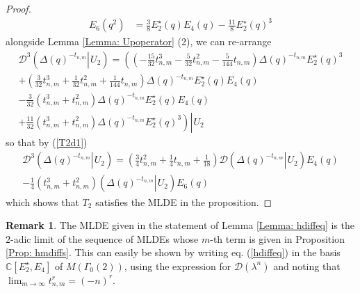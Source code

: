 \documentclass[10pt,a4paper]{amsart}
\numberwithin{equation}{section}
\theoremstyle{definition}
\newtheorem{Rem}[Th]{Remark}
\newcommand{\haupt}{\lambda}
\newcommand{\utwo}[1]{\left. #1 \right\rvert \hspace{1pt} U_{2}}
\begin{document}
\begin{proof}
\begin{align*}
           E_{6}(q^{2}) &= \frac{3}{8}E_{2}^{\star}(q)E_{4}(q) - \frac{11}{8}E_{2}^{\star}(q)^{3}
       \end{align*}
   alongside Lemma \ref{Lemma: Upoperator} (2), we can re-arrange
   \begin{multline*}
           \mathcal{D}^{3} \left( \utwo{ \Delta (q)^{-t_{n,m}} } \right) = \left. \left( \left( - \frac{15}{32} t_{n,m}^{3} - \frac{5}{32} t_{n,m}^{2} - \frac{5}{144} t_{n,m} \right) \Delta (q)^{-t_{n,m}}E_{2}^{\star}(q)^{3} \right. \right. \\ 
           \left. \left. + \left( \frac{3}{32} t_{n,m}^{3} + \frac{1}{32} t_{n,m}^{2} + \frac{1}{144} t_{n,m} \right) \Delta (q)^{- t_{n,m}} E_{2}^{\star}(q)E_{4}(q) \right. \right. \\
           \left. \left. - \frac{3}{32} \left( t_{n,m}^{3} + t_{n,m}^{2} \right) \Delta (q)^{- t_{n,m}} E_{2}^{\star}(q)E_{4}(q) \right. \right. \\
           \utwo{ \left. + \frac{11}{32} \left( t_{n,m}^{3} + t_{n,m}^{2} \right) \Delta (q)^{- t_{n,m}} E_{2}^{\star}(q)^{3} \right) }
       \end{multline*}
       so that by (\ref{T2d1})
       \begin{multline*}
           \mathcal{D}^{3} \left( \utwo{ \Delta (q)^{- t_{n,m}} } \right) = \left( \frac{3}{4} t_{n,m}^{2} + \frac{1}{4} t_{n,m} + \frac{1}{18} \right) \mathcal{D} \left( \utwo{ \Delta (q)^{- t_{n,m}} } \right) E_{4}(q) \\
           - \frac{1}{4} \left( t_{n,m}^{3} + t_{n,m}^{2} \right) \left( \utwo{ \Delta (q)^{- t_{n,m}} } \right) E_{6}(q)
       \end{multline*}
       which shows that $T_{2}$ satisfies the MLDE in the proposition.
\end{proof}

\begin{Rem}
The MLDE given in the statement of Lemma \ref{Lemma: hdiffeq} is the $2$-adic limit of the sequence of MLDEs whose $m$-th term is given in Proposition \ref{Prop: hmdiffs}. This can easily be shown by writing eq. (\ref{hdiffeq}) in the basis $\mathbb{C}[E_{2}^{\star},E_{4}]$ of $M(\Gamma_{0}(2))$, using the expression for $\mathcal{D}(\haupt^{n})$ and noting that $\lim_{m \to \infty} t_{n,m}^{r} = (-n)^{r}$.
\end{Rem}
\end{document}
